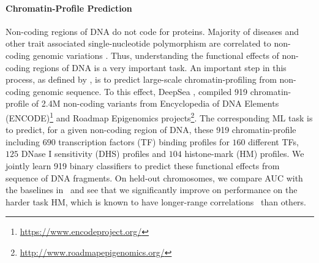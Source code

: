 \paragraph{Chromatin-Profile Prediction} Non-coding regions of DNA do not code for proteins.  
Majority of diseases and other trait associated single-nucleotide polymorphism are correlated to non-coding genomic variations \citep{zhou2015predicting, khurana2016role}.
Thus, understanding the functional effects of non-coding regions of DNA is a very important task. An important step in this process, as defined by \citet{zhou2015predicting}, is to predict large-scale chromatin-profiling from non-coding genomic sequence. 
To this effect, DeepSea \citep{zhou2015predicting}, compiled 919 chromatin-profile of 2.4M non-coding variants from Encyclopedia of DNA Elements (ENCODE)\footnote{\url{https://www.encodeproject.org/}} and Roadmap Epigenomics projects\footnote{\url{http://www.roadmapepigenomics.org/}}. 
The corresponding ML task is to predict, for a given non-coding region of DNA, these 919 chromatin-profile including $690$ transcription factors (TF) binding profiles for $160$ different TFs, $125$ DNase I sensitivity (DHS) profiles and $104$ histone-mark (HM) profiles. 
We jointly learn 919 binary classifiers to predict these functional effects from sequence of DNA fragments.
On held-out chromosomes, we compare AUC with the baselines in~ and see that we significantly improve on  performance on the harder task HM, which is known to have longer-range correlations~\citep{gates2017histone} than others.